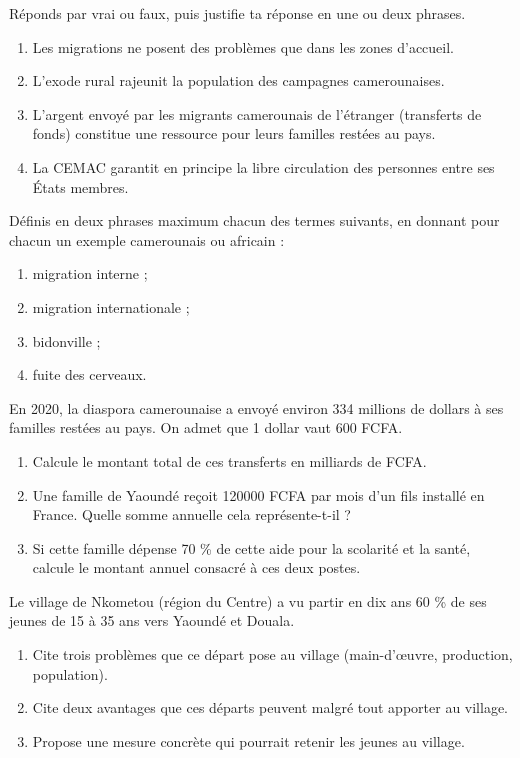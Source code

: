 \documentclass[11pt]{article}
\newcounter{popsec}
\newcounter{popsub}
\newcommand{\courssub}[1]{%
  \stepcounter{popsub}%
  \par\vspace{9pt}\noindent{\popxbold\fontsize{11.5}{13}\selectfont\color{popink}{\color{poporange}\thepopsec.\thepopsub}\hspace{6pt}#1}\par\nopagebreak\vspace{4pt}
}
\begin{document}
\begin{exercice}
Réponds par vrai ou faux, puis justifie ta réponse en une ou deux phrases.
\begin{enumerate}
\item Les migrations ne posent des problèmes que dans les zones d'accueil.
\item L'exode rural rajeunit la population des campagnes camerounaises.
\item L'argent envoyé par les migrants camerounais de l'étranger (transferts de fonds) constitue une ressource pour leurs familles restées au pays.
\item La CEMAC garantit en principe la libre circulation des personnes entre ses États membres.
\end{enumerate}
\end{exercice}

\begin{exercice}[Définitions]
Définis en deux phrases maximum chacun des termes suivants, en donnant pour chacun un exemple camerounais ou africain :
\begin{enumerate}
\item migration interne ;
\item migration internationale ;
\item bidonville ;
\item fuite des cerveaux.
\end{enumerate}
\end{exercice}

\begin{exercice}
En 2020, la diaspora camerounaise a envoyé environ \num{334} millions de dollars à ses familles restées au pays. On admet que 1 dollar vaut 600 FCFA.
\begin{enumerate}
\item Calcule le montant total de ces transferts en milliards de FCFA.
\item Une famille de Yaoundé reçoit \num{120000} FCFA par mois d'un fils installé en France. Quelle somme annuelle cela représente-t-il ?
\item Si cette famille dépense 70 \% de cette aide pour la scolarité et la santé, calcule le montant annuel consacré à ces deux postes.
\end{enumerate}
\end{exercice}

\courssub{Je m'entraîne}

\begin{exercice}
Le village de Nkometou (région du Centre) a vu partir en dix ans 60 \% de ses jeunes de 15 à 35 ans vers Yaoundé et Douala.
\begin{enumerate}
\item Cite trois problèmes que ce départ pose au village (main-d'œuvre, production, population).
\item Cite deux avantages que ces départs peuvent malgré tout apporter au village.
\item Propose une mesure concrète qui pourrait retenir les jeunes au village.
\end{enumerate}
\end{exercice}
\end{document}

